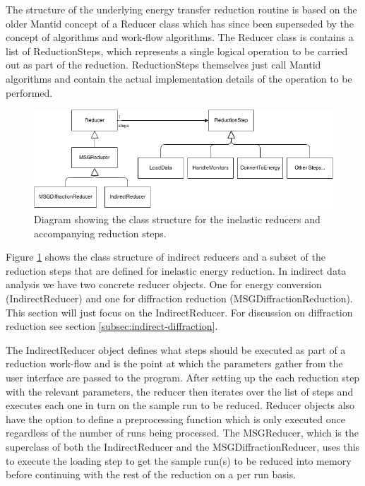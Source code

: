 \documentclass[paper=a4, fontsize=11pt]{scrartcl}	%
\numberwithin{equation}{section}															%
\numberwithin{figure}{section}																%
\numberwithin{table}{section}																%
\begin{document}
The structure of the underlying energy transfer reduction routine is based on the older Mantid concept of a Reducer class which has since been superseded by the concept of algorithms and work-flow algorithms. The Reducer class is contains a list of ReductionSteps, which represents a single logical operation to be carried out as part of the reduction. ReductionSteps themselves just call Mantid algorithms and contain the actual implementation details of the operation to be performed.

\begin{figure}[H]
\centering
\includegraphics[width=1\textwidth]{img/uml/class_diagrams/Reducer_structure.png}
\caption{Diagram showing the class structure for the inelastic reducers and accompanying reduction steps.}
\label{fig:reducer-structure-diagram}
\end{figure}

Figure \ref{fig:reducer-structure-diagram} shows the class structure of indirect reducers and a subset of the reduction steps that are defined for inelastic energy reduction. In indirect data analysis we have two concrete reducer objects. One for energy conversion (IndirectReducer) and one for diffraction reduction (MSGDiffractionReduction). This section will just focus on the IndirectReducer. For discussion on diffraction reduction see section \ref{subsec:indirect-diffraction}.

The IndirectReducer object defines what steps should be executed as part of a reduction work-flow and is the point at which the parameters gather from the user interface are passed to the program. After setting up the each reduction step with the relevant parameters, the reducer then iterates over the list of steps and executes each one in turn on the sample run to be reduced. Reducer objects also have the option to define a preprocessing function which is only executed once regardless of the number of runs being processed. The MSGReducer, which is the superclass of both the IndirectReducer and the MSGDiffractionReducer, uses this to execute the loading step to get the sample run(s) to be reduced into memory before continuing with the rest of the reduction on a per run basis.
\end{document}
